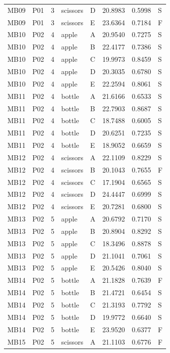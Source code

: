 \documentclass[11pt]{article}
\begin{document}
\begin{longtable}{lll llrrl}
MB09 & P01 & 3 & scissors & D & 20.8983 & 0.5998 & S \\
MB09 & P01 & 3 & scissors & E & 23.6364 & 0.7184 & F \\
MB10 & P02 & 4 & apple & A & 20.9540 & 0.7275 & S \\
MB10 & P02 & 4 & apple & B & 22.4177 & 0.7386 & S \\
MB10 & P02 & 4 & apple & C & 19.9973 & 0.8459 & S \\
MB10 & P02 & 4 & apple & D & 20.3035 & 0.6780 & S \\
MB10 & P02 & 4 & apple & E & 22.2594 & 0.8061 & S \\
MB11 & P02 & 4 & bottle & A & 21.6166 & 0.6533 & S \\
MB11 & P02 & 4 & bottle & B & 22.7903 & 0.8687 & S \\
MB11 & P02 & 4 & bottle & C & 18.7488 & 0.6005 & S \\
MB11 & P02 & 4 & bottle & D & 20.6251 & 0.7235 & S \\
MB11 & P02 & 4 & bottle & E & 18.9052 & 0.6659 & S \\
MB12 & P02 & 4 & scissors & A & 22.1109 & 0.8229 & S \\
MB12 & P02 & 4 & scissors & B & 20.1043 & 0.7655 & F \\
MB12 & P02 & 4 & scissors & C & 17.1904 & 0.6565 & S \\
MB12 & P02 & 4 & scissors & D & 24.4447 & 0.6999 & S \\
MB12 & P02 & 4 & scissors & E & 20.7281 & 0.6800 & S \\
MB13 & P02 & 5 & apple & A & 20.6792 & 0.7170 & S \\
MB13 & P02 & 5 & apple & B & 20.8904 & 0.8292 & S \\
MB13 & P02 & 5 & apple & C & 18.3496 & 0.8878 & S \\
MB13 & P02 & 5 & apple & D & 21.1041 & 0.7061 & S \\
MB13 & P02 & 5 & apple & E & 20.5426 & 0.8040 & S \\
MB14 & P02 & 5 & bottle & A & 21.1828 & 0.7639 & F \\
MB14 & P02 & 5 & bottle & B & 21.4721 & 0.6454 & S \\
MB14 & P02 & 5 & bottle & C & 21.3193 & 0.7792 & S \\
MB14 & P02 & 5 & bottle & D & 19.9772 & 0.6640 & S \\
MB14 & P02 & 5 & bottle & E & 23.9520 & 0.6377 & F \\
MB15 & P02 & 5 & scissors & A & 21.1103 & 0.6776 & F \\

\end{longtable}
\end{document}
